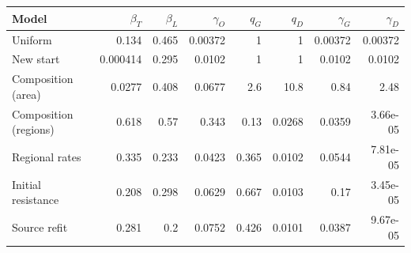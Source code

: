 \begin{tabular}{lrrrrrrr}\toprule Model & $\beta_T$ & $\beta_L$ & $\gamma_O$ & $q_G$ & $q_D$ & $\gamma_G$ & $\gamma_D$\\\midrule
Uniform & 0.134 & 0.465 & 0.00372 & 1 & 1 & 0.00372 & 0.00372\\
New start & 0.000414 & 0.295 & 0.0102 & 1 & 1 & 0.0102 & 0.0102\\
Composition (area) & 0.0277 & 0.408 & 0.0677 & 2.6 & 10.8 & 0.84 & 2.48\\
Composition (regions) & 0.618 & 0.57 & 0.343 & 0.13 & 0.0268 & 0.0359 & 3.66e-05\\
Regional rates & 0.335 & 0.233 & 0.0423 & 0.365 & 0.0102 & 0.0544 & 7.81e-05\\
Initial resistance & 0.208 & 0.298 & 0.0629 & 0.667 & 0.0103 & 0.17 & 3.45e-05\\
Source refit & 0.281 & 0.2 & 0.0752 & 0.426 & 0.0101 & 0.0387 & 9.67e-05\\
\bottomrule\end{tabular}